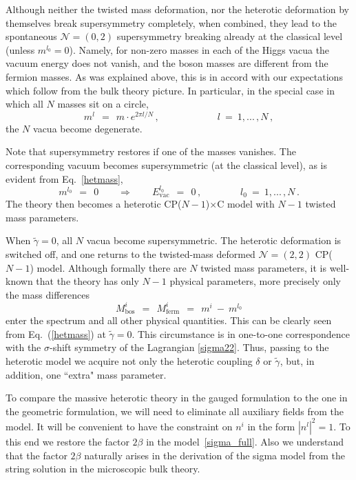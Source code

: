\documentclass[12pt]{article}
\newcommand{\ntwot}{${\mathcal N}= \left(2,2\right) $ }
\newcommand{\ntwoo}{${\mathcal N}= \left(0,2\right) $ }
\newcommand{\wt}{\widetilde}
\newcommand{\CPC}{CP($N-1$)$\times$C }
\newcommand{\tgamma}{\wt{\gamma}}
\begin{document}
	Although neither the twisted mass deformation, nor the heterotic deformation by themselves break supersymmetry completely, when combined, they lead to the spontaneous \ntwoo supersymmetry breaking
	already at the classical level (unless $m^{l_0}=0$).
 Namely, for non-zero masses 
in each of the Higgs vacua
the vacuum energy does not vanish,  and the boson masses are different from the fermion masses. As was explained
above, this is in accord with our expectations which follow
from the bulk theory picture. In particular, in the special case in which all $N$ masses sit on a circle, 
\[
	m^l ~~=~~ m \cdot e^{2\pi l/N}\,, \qquad\qquad\qquad  l ~=~ 1,...\,, N\,,
\]
	the $ N $ vacua become degenerate.

	Note that supersymmetry restores if one of the masses vanishes.
	The corresponding vacuum becomes supersymmetric
	(at the classical level), as is evident from 
	Eq.~\eqref{hetmass},
\[
	m^{l_0} ~~=~~ 0  \qquad \Rightarrow \qquad E_\text{vac}^{l_0} ~~=~~ 0\,, \qquad\qquad l_0 ~=~ 1,...\,, N\,.
\]
	The theory then becomes a heterotic \CPC model with $ N - 1 $ twisted mass parameters.

	When $ \tgamma = 0 $,   all $ N $ vacua become supersymmetric.
	The heterotic deformation is switched off,
	 and one returns to the twisted-mass deformed \ntwot CP($N-1$) model.
	Although formally there are $ N $ twisted mass parameters, it is well-known that the theory 
	has only $ N - 1 $ physical parameters, more precisely only the mass differences
\[
	M_\text{bos}^i ~~=~~ M_\text{ferm}^i ~~=~~ m^i ~-~ m^{l_0}
\]
enter the spectrum and all other physical
quantities. This can be clearly seen from 
Eq.~(\ref{hetmass}) at $\tgamma =0$. This circumstance is in one-to-one correspondence
with the $\sigma$-shift symmetry of 
the Lagrangian \eqref{sigma22}. Thus, passing
to the heterotic model we acquire not only the heterotic coupling $\delta$ or $\tgamma$,
but, in addition, one ``extra" mass parameter.
	
        To compare the massive heterotic theory in the gauged  formulation to
        the one in the geometric formulation, we will need to eliminate all auxiliary fields from the model. It will be convenient  to have the constraint on $n^i$ in the
        form $ | n^l |^2 = 1 $. To this end we restore the factor 
        $ 2\beta $ in  the model~\eqref{sigma_full}.
        Also we understand that the factor   $ 2\beta $  naturally arises in the 
derivation of  the sigma model from the   string
solution in the microscopic bulk theory.
\end{document}

